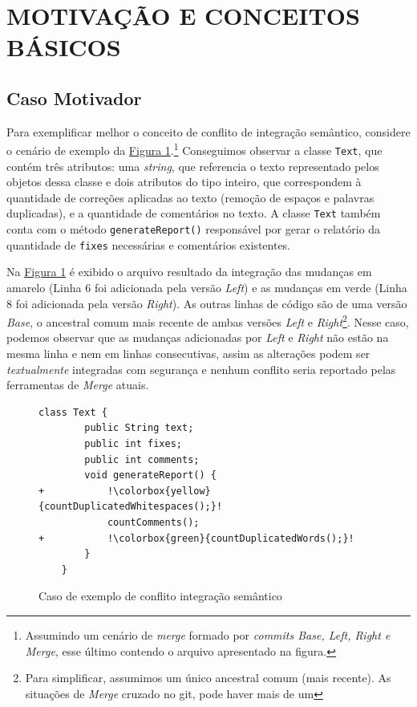 \section{MOTIVAÇÃO E CONCEITOS BÁSICOS}
\subsection{Caso Motivador}
Para exemplificar melhor o conceito de conflito de integração semântico, considere o cenário de exemplo da \hyperref[fig:codigo-motivador]{Figura 1}.\footnote{Assumindo um cenário de \emph{merge} formado por \emph{commits Base, Left, Right e Merge}, esse último contendo o arquivo apresentado na figura.} Conseguimos observar a classe \texttt{Text}, que contém três atributos: uma \emph{string}, que referencia o texto representado pelos objetos dessa classe e dois atributos do tipo inteiro, que correspondem à quantidade de correções aplicadas ao texto (remoção de espaços e palavras duplicadas), e a quantidade de comentários no texto. A classe \texttt{Text} também conta com o método \texttt{generateReport()} responsável por gerar o relatório da quantidade de \texttt{fixes} necessárias e comentários existentes.

Na \hyperref[fig:codigo-motivador]{Figura 1} é exibido o arquivo resultado da integração das mudanças em amarelo (Linha 6 foi adicionada pela versão \emph{Left}) e as mudanças em verde (Linha 8 foi adicionada pela versão \emph{Right}). As outras linhas de código são de uma versão \emph{Base}, o ancestral comum mais recente de ambas versões \emph{Left} e \emph{Right}\footnote{Para simplificar, assumimos um único ancestral comum (mais recente). As situações de \emph{Merge} cruzado no git, pode haver mais de um}. Nesse caso, podemos observar que as mudanças adicionadas por \emph{Left} e \emph{Right} não estão na mesma linha e nem em linhas consecutivas, assim as alterações podem ser \emph{textualmente} integradas com segurança e nenhum conflito seria reportado pelas ferramentas de \emph{Merge} atuais. 

\begin{figure}[!h]
    \begin{lstlisting}[escapechar=!]
    class Text {
        public String text;
        public int fixes;
        public int comments;
        void generateReport() {
+           !\colorbox{yellow}{countDuplicatedWhitespaces();}!
            countComments();
+           !\colorbox{green}{countDuplicatedWords();}!
        }
    }
    \end{lstlisting}
    \caption{Caso de exemplo de conflito integração semântico}
    \label{fig:codigo-motivador}
\end{figure}


